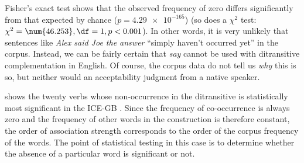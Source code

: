 Fisher's exact test  shows that the observed frequency  of zero differs significantly from that expected  by chance  ($p = \num[round-precision=2,round-mode=figures,scientific-notation=true]{4.29e-165}$) (so does a $\chi^2$  test: $\chi^2 = \num{46.253}, \df = 1, p < 0.001$). In other words, it is very unlikely that sentences like \textit{Alex said Joe the answer} ``simply haven't occurred yet'' in the corpus. Instead, we can be fairly certain that \textit{say} cannot be used with ditransitive  complementation in English. Of course, the corpus data do not tell us \textit{why} this is so, but neither would an acceptability  judgment from a native speaker.

 shows the twenty verbs  whose non\hyp{}occurrence in the ditransitive  is statistically most significant in the ICE\hyp{}GB  \citep[see][67]{stefanowitsch_negative_2006}. Since the frequency  of co\hyp{}occurrence is always zero and the frequency of other words in the construction is therefore constant, the order of association  strength corresponds to the order of the corpus frequency of the words. The point of statistical testing in this case is to determine whether the absence of a particular word is significant or not.

